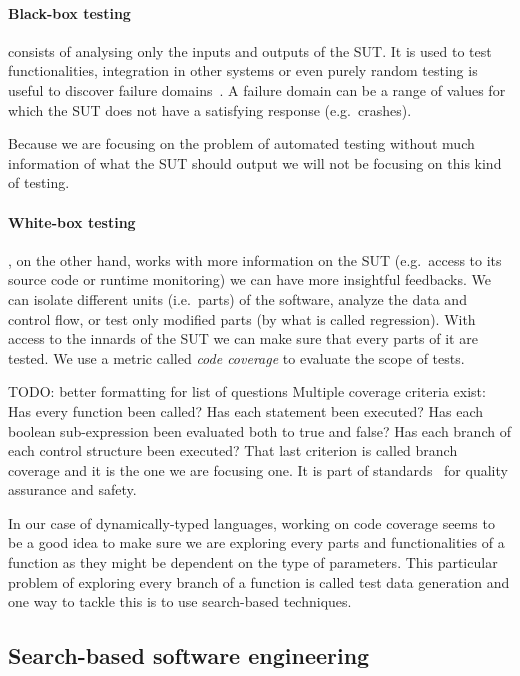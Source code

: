 \documentclass{llncs2e/llncs}
\makeatletter
\def\todo#1{{\color{red}TODO\@: #1}}
\makeatother
\begin{document}
\paragraph{Black-box testing} consists of analysing only the inputs and
outputs of the SUT\@. It is used to test functionalities, integration in other
systems or even purely random testing is useful to discover failure
domains~\cite{ahmad2014new}. A failure domain can be a range of values for which
the SUT does not have a satisfying response (e.g.\ crashes).

Because we are focusing on the problem of automated testing without much
information of what the SUT should output we will not be focusing on this kind
of testing.

\paragraph{White-box testing}, on the other hand, works with more information on
the SUT (e.g.\ access to its source code or runtime monitoring) we can have more
insightful feedbacks. We can isolate different units (i.e.\ parts) of the
software, analyze the data and control flow, or test only modified parts (by
what is called regression).  With access to the innards of the SUT we can make
sure that every parts of it are tested. We use a metric called \textit{code
coverage} to evaluate the scope of tests.

\todo{better formatting for list of questions}
Multiple coverage criteria exist: Has every function been called? Has each
statement been executed? Has each boolean sub-expression been evaluated both to
true and false? Has each branch of each control structure been executed? That
last criterion is called branch coverage and it is the one we are focusing one.
It is part of standards~\cite{BSI98,RTCA92} for quality assurance and safety.

In our case of dynamically-typed languages, working on code coverage seems to be
a good idea to make sure we are exploring every parts and functionalities of a
function as they might be dependent on the type of parameters. This particular
problem of exploring every branch of a function is called test data generation
and one way to tackle this is to use search-based techniques.

\subsection{Search-based software engineering}
\label{sbse}
\end{document}
